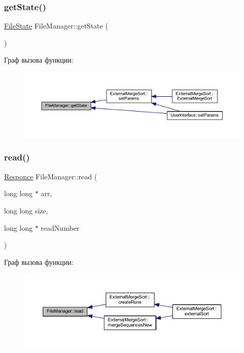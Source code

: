\subsubsection{\texorpdfstring{get\+State()}{getState()}}
{\footnotesize\ttfamily \hyperlink{_structures_8h_a57306ae0f9e356347388234ed69e0ce7}{File\+State} File\+Manager\+::get\+State (\begin{DoxyParamCaption}{ }\end{DoxyParamCaption})}

Граф вызова функции\+:\nopagebreak
\begin{figure}[H]
\begin{center}
\leavevmode
\includegraphics[width=350pt]{class_file_manager_abd4cbc2b218ab1828ae376a4a9137057_icgraph}
\end{center}
\end{figure}
\hypertarget{class_file_manager_aba031d681752c80f52a8a8af9b69834e}{}\label{class_file_manager_aba031d681752c80f52a8a8af9b69834e} 
\subsubsection{\texorpdfstring{read()}{read()}}
{\footnotesize\ttfamily \hyperlink{_structures_8h_a9864d6ef28dd6e38416afac4426b3491}{Responce} File\+Manager\+::read (\begin{DoxyParamCaption}\item[{long long $\ast$}]{arr,  }\item[{long long}]{size,  }\item[{long long $\ast$}]{read\+Number }\end{DoxyParamCaption})}

Граф вызова функции\+:\nopagebreak
\begin{figure}[H]
\begin{center}
\leavevmode
\includegraphics[width=350pt]{class_file_manager_aba031d681752c80f52a8a8af9b69834e_icgraph}
\end{center}
\end{figure}
\hypertarget{class_file_manager_ace8ce2677414831b5a9e7030248fc832}{}\label{class_file_manager_ace8ce2677414831b5a9e7030248fc832} 
